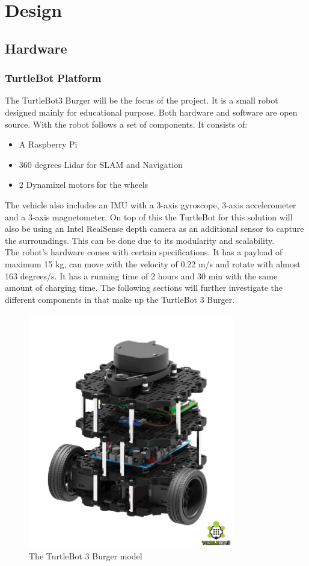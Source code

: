 \part{Design}

\chapter{Hardware}
\color{blue}

\section{TurtleBot Platform}
The TurtleBot3 Burger will be the focus of the project. It is a small robot designed mainly for educational purpose. Both hardware and software are open source. With the robot follows a set of components. It consists of:
\begin{itemize}
    \item A Raspberry Pi
    \item 360 degrees Lidar for SLAM and Navigation
    \item 2 Dynamixel motors for the wheels
 \end{itemize}
The vehicle also includes an IMU with a 3-axis gyroscope, 3-axis accelerometer and a 3-axis magnetometer. On top of this the TurtleBot for this solution will also be using an Intel RealSense depth camera as an additional sensor to capture the surroundings. This can be done due to its modularity and scalability.  \\
The robot's hardware comes with certain specifications. It has a payload of maximum 15 kg, can move with the velocity of 0.22 m/s and rotate with almost 163 degrees/s. It has a running time of 2 hours and 30 min with the same amount of charging time. The following sections will further investigate the different components in that make up the TurtleBot 3 Burger.
\begin{figure}[H]
\centering
\includegraphics[width=0.8\textwidth]{Figures/ConAnalysis/General/Turtlebot3_burger.jpg}
\caption{The TurtleBot 3 Burger model}
\label{fig:TB3}
\end{figure}

